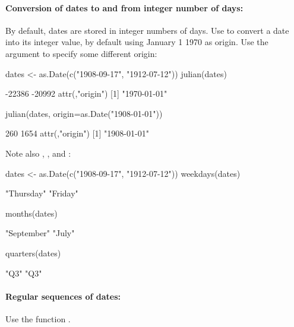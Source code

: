 \paragraph{Conversion of dates to and from integer number of days:}
By default, dates are stored in integer numbers of days.  Use
 to convert a date into its integer value, by default
using January 1 1970 as origin.  Use the argument 
to specify some different origin:
\begin{Schunk}
\begin{Sinput}
dates <- as.Date(c("1908-09-17", "1912-07-12"))
julian(dates)
\end{Sinput}
\begin{Soutput}
[1] -22386 -20992
attr(,"origin")
[1] "1970-01-01"
\end{Soutput}
\begin{Sinput}
julian(dates, origin=as.Date("1908-01-01"))
\end{Sinput}
\begin{Soutput}
[1]  260 1654
attr(,"origin")
[1] "1908-01-01"
\end{Soutput}
\end{Schunk}

Note also , , and :
\begin{Schunk}
\begin{Sinput}
dates <- as.Date(c("1908-09-17", "1912-07-12"))
weekdays(dates)
\end{Sinput}
\begin{Soutput}
[1] "Thursday" "Friday"  
\end{Soutput}
\begin{Sinput}
months(dates)
\end{Sinput}
\begin{Soutput}
[1] "September" "July"     
\end{Soutput}
\begin{Sinput}
quarters(dates)
\end{Sinput}
\begin{Soutput}
[1] "Q3" "Q3"
\end{Soutput}
\end{Schunk}

\paragraph{Regular sequences of dates:}  Use the function .


